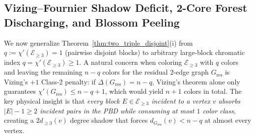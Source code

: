 \documentclass[11pt,reqno]{amsart}
\theoremstyle{definition}
\theoremstyle{remark}
\begin{document}
\subsection{Vizing--Fournier Shadow Deficit, 2-Core Forest Discharging, and Blossom Peeling}

We now generalize Theorem~\ref{thm:two_triple_disjoint}(i) from $q := \chi'(\mathcal{E}_{\ge 3}) = 1$ (pairwise disjoint blocks) to arbitrary large-block chromatic index $q = \chi'(\mathcal{E}_{\ge 3}) \ge 1$. A natural concern when coloring $\mathcal{E}_{\ge 3}$ with $q$ colors and leaving the remaining $n - q$ colors for the residual $2$-edge graph $G_{\mathrm{res}}$ is Vizing's $+1$ Class-2 penalty: if $\Delta(G_{\mathrm{res}}) = n - q$, Vizing's theorem alone only guarantees $\chi'(G_{\mathrm{res}}) \le n - q + 1$, which would yield $n + 1$ colors in total. The key physical insight is that \emph{every block $E \in \mathcal{E}_{\ge 3}$ incident to a vertex $v$ absorbs $|E| - 1 \ge 2$ incident pairs in the PBD while consuming at most $1$ color class}, creating a $2 d_{\ge 3}(v)$ degree shadow that forces $d_{G_{\mathrm{res}}}(v) < n - q$ at almost every vertex.
\end{document}
